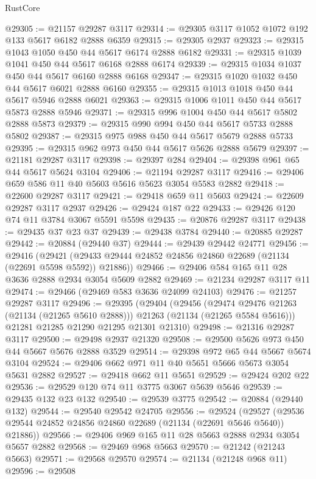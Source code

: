 \begin{lexlean}{RustCore}
\begin{coremodule}
@29305 := @21157 @29287 @3117
@29314 := @29305 @3117 @1052 @1072 @192 @133 @5617 @6182 @2888 @6359
@29315 := @29305 @2937
@29323 := @29315 @1043 @1050 @450 @44 @5617 @6174 @2888 @6182
@29331 := @29315 @1039 @1041 @450 @44 @5617 @6168 @2888 @6174
@29339 := @29315 @1034 @1037 @450 @44 @5617 @6160 @2888 @6168
@29347 := @29315 @1020 @1032 @450 @44 @5617 @6021 @2888 @6160
@29355 := @29315 @1013 @1018 @450 @44 @5617 @5946 @2888 @6021
@29363 := @29315 @1006 @1011 @450 @44 @5617 @5873 @2888 @5946
@29371 := @29315 @996 @1004 @450 @44 @5617 @5802 @2888 @5873
@29379 := @29315 @990 @994 @450 @44 @5617 @5733 @2888 @5802
@29387 := @29315 @975 @988 @450 @44 @5617 @5679 @2888 @5733
@29395 := @29315 @962 @973 @450 @44 @5617 @5626 @2888 @5679
@29397 := @21181 @29287 @3117
@29398 := @29397 @284
@29404 := @29398 @961 @65 @44 @5617 @5624 @3104
@29406 := @21194 @29287 @3117
@29416 := @29406 @659 @586 @11 @40 @5603 @5616 @5623 @3054 @5583 @2882
@29418 := @22600 @29287 @3117
@29421 := @29418 @659 @11 @5603
@29424 := @22609 @29287 @3117 @2937
@29426 := @29424 @187 @22
@29433 := @29426 @120 @74 @11 @3784 @3067 @5591 @5598
@29435 := @20876 @29287 @3117
@29438 := @29435 @37 @23 @37
@29439 := @29438 @3784
@29440 := @20885 @29287
@29442 := @20884 (@29440 @37)
@29444 := @29439 @29442 @24771
@29456 := @29416
    (@29421 (@29433 @29444 @24852 @24856 @24860 @22689 (@21134 (@22691 @5598 @5592)) @21886))
@29466 := @29406 @584 @165 @11 @28 @3636 @2888 @2934 @3054 @5609 @2882
@29469 := @21234 @29287 @3117 @11
@29474 := @29466 (@29469 @583 @3636 @24099 @24103)
@29476 := @21257 @29287 @3117
@29496 := @29395
    (@29404
      (@29456
        (@29474 @29476 @21263 (@21134 (@21265 @5610 @2888)))
        @21263
        (@21134 (@21265 @5584 @5616)))
      @21281
      @21285
      @21290
      @21295
      @21301
      @21310)
@29498 := @21316 @29287 @3117
@29500 := @29498 @2937 @21320
@29508 := @29500 @5626 @973 @450 @44 @5667 @5676 @2888 @3529
@29514 := @29398 @972 @65 @44 @5667 @5674 @3104
@29524 := @29406 @662 @971 @11 @40 @5651 @5666 @5673 @3054 @5631 @2882
@29527 := @29418 @662 @11 @5651
@29529 := @29424 @202 @22
@29536 := @29529 @120 @74 @11 @3775 @3067 @5639 @5646
@29539 := @29435 @132 @23 @132
@29540 := @29539 @3775
@29542 := @20884 (@29440 @132)
@29544 := @29540 @29542 @24705
@29556 := @29524
    (@29527 (@29536 @29544 @24852 @24856 @24860 @22689 (@21134 (@22691 @5646 @5640)) @21886))
@29566 := @29406 @969 @165 @11 @28 @5663 @2888 @2934 @3054 @5657 @2882
@29568 := @29469 @968 @5663
@29570 := @21242 (@21243 @5663)
@29571 := @29568 @29570
@29574 := @21134 (@21248 @968 @11)
@29596 := @29508

\end{coremodule}
\end{lexlean}
